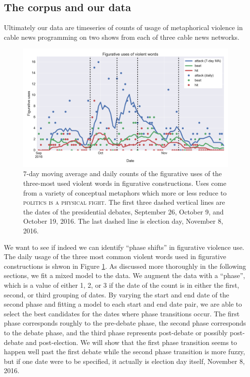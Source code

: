 \subsection{The corpus and our data}

Ultimately our data are timeseries of counts of usage of metaphorical violence
in cable news programming on two shows from each of three cable news networks.

\begin{figure}
\begin{center}
  \hspace*{-.25in}
  \includegraphics[width=1.25\textwidth]{figures/fig_uses_violent_words-FIG1.pdf}
\end{center}
\caption{
  7-day moving average and daily counts of the figurative uses of the three-most
  used violent words in figurative constructions. Uses come from a variety of
  conceptual metaphors which more or less reduce to 
  \textsc{politics is a physical fight}. The first three dashed 
  vertical lines are the dates of the presidential debates, 
  September 26, October 9, and October 19, 2016. The last dashed
  line is election day, November 8, 2016.
}
\label{fig:timeseries}
\end{figure}

We want to see if indeed we can identify ``phase shifts'' in figurative 
violence use. The daily usage of the three most common violent words used in 
figurative constructions is shwon in Figure \ref{fig:timeseries}. As discussed more thoroughly in the following sections, we fit a mixed model to the data. We
augment the data with a ``phase'', which is a value of either 1, 2, or 3 if
the date of the count is in either the first, second, or third grouping of 
dates. By varying the start and end date of the second phase and fitting a
model to each start and end date pair, we are able to select the best 
candidates for the dates where phase transitions occur. The first phase 
corresponds roughly to the pre-debate phase, the second phase corresponds to
the debate phase, and the third phase represents post-debate or possibly 
post-debate and post-election. We will show that the first phase transition
seems to happen well past the first debate while the second phase transition
is more fuzzy, but if one date were to be specified, it actually is 
election day itself, November 8, 2016.


